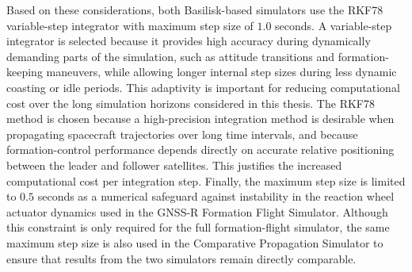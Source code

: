 Based on these considerations, both Basilisk-based simulators use the RKF78 variable-step integrator with maximum step size of $1.0$ seconds. A variable-step integrator is selected because it provides high accuracy during dynamically demanding parts of the simulation, such as attitude transitions and formation-keeping maneuvers, while allowing longer internal step sizes during less dynamic coasting or idle periods. This adaptivity is important for reducing computational cost over the long simulation horizons considered in this thesis. The RKF78 method is chosen because a high-precision integration method is desirable when propagating spacecraft trajectories over long time intervals, and because formation-control performance depends directly on accurate relative positioning between the leader and follower satellites. This justifies the increased computational cost per integration step. Finally, the maximum step size is limited to $0.5$ seconds as a numerical safeguard against instability in the reaction wheel actuator dynamics used in the GNSS-R Formation Flight Simulator. Although this constraint is only required for the full formation-flight simulator, the same maximum step size is also used in the Comparative Propagation Simulator to ensure that results from the two simulators remain directly comparable.